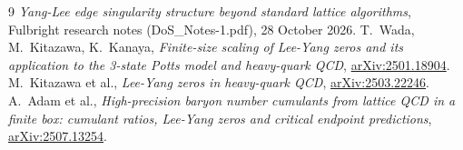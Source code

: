 \documentclass[11pt,a4paper]{article}
\begin{document}
\begin{thebibliography}{9}
 \emph{Yang-Lee edge singularity structure beyond standard lattice algorithms}, Fulbright research notes (DoS\_Notes-1.pdf), 28 October 2026.
 T.~Wada, M.~Kitazawa, K.~Kanaya, \emph{Finite-size scaling of Lee-Yang zeros and its application to the 3-state Potts model and heavy-quark QCD}, \href{https://arxiv.org/abs/2501.18904}{arXiv:2501.18904}.
 M.~Kitazawa et al., \emph{Lee-Yang zeros in heavy-quark QCD}, \href{https://arxiv.org/abs/2503.22246}{arXiv:2503.22246}.
 A.~Adam et al., \emph{High-precision baryon number cumulants from lattice QCD in a finite box: cumulant ratios, Lee-Yang zeros and critical endpoint predictions}, \href{https://arxiv.org/abs/2507.13254}{arXiv:2507.13254}.
\end{thebibliography}
\end{document}
